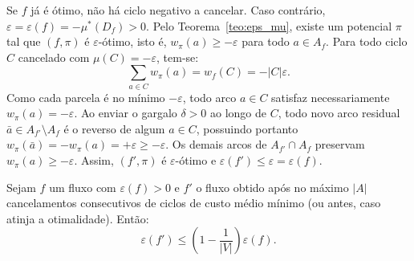 \begin{demonstracao}
Se $f$ já é ótimo, não há ciclo negativo a cancelar. Caso contrário, $\varepsilon = \varepsilon(f) = -\mu^*(D_f) > 0$. Pelo Teorema~\ref{teo:eps_mu}, existe um potencial $\pi$ tal que $(f, \pi)$ é $\varepsilon$-ótimo, isto é, $w_\pi(a) \ge -\varepsilon$ para todo $a \in A_f$. Para todo ciclo $C$ cancelado com $\mu(C) = -\varepsilon$, tem-se:
\begin{equation*}
    \sum_{a \in C} w_\pi(a) = w_f(C) = -|C|\varepsilon.
\end{equation*}
Como cada parcela é no mínimo $-\varepsilon$, todo arco $a \in C$ satisfaz necessariamente $w_\pi(a) = -\varepsilon$. Ao enviar o gargalo $\delta > 0$ ao longo de $C$, todo novo arco residual $\bar{a} \in A_{f'} \setminus A_f$ é o reverso de algum $a \in C$, possuindo portanto $w_\pi(\bar{a}) = -w_\pi(a) = +\varepsilon \ge -\varepsilon$. Os demais arcos de $A_{f'} \cap A_f$ preservam $w_\pi(a) \ge -\varepsilon$. Assim, $(f', \pi)$ é $\varepsilon$-ótimo e $\varepsilon(f') \le \varepsilon = \varepsilon(f)$.
\end{demonstracao}

\begin{prop}\label{prop:mmcc_reducao}
Sejam $f$ um fluxo com $\varepsilon(f) > 0$ e $f'$ o fluxo obtido após no máximo $|A|$ cancelamentos consecutivos de ciclos de custo médio mínimo (ou antes, caso atinja a otimalidade). Então:
\begin{equation}
    \varepsilon(f') \le \left(1 - \frac{1}{|V|}\right)\varepsilon(f).
\end{equation}
\end{prop}

